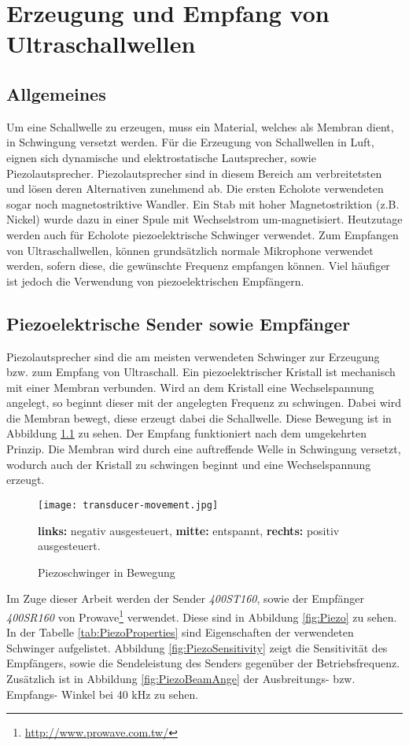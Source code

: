 \chapter{Erzeugung und Empfang von Ultraschallwellen}
\label{cha:UltraschallSendRecive}
\section{Allgemeines}
Um eine Schallwelle zu erzeugen, muss ein Material, welches als Membran dient, in Schwingung versetzt werden. Für die Erzeugung von Schallwellen in Luft, eignen sich dynamische und elektrostatische Lautsprecher, sowie Piezolautsprecher. Piezolautsprecher sind in diesem Bereich am verbreitetsten und lösen deren Alternativen zunehmend ab. Die ersten Echolote verwendeten sogar noch magnetostriktive Wandler. Ein Stab mit hoher Magnetostriktion (z.B. Nickel) wurde dazu in einer Spule mit Wechselstrom um-magnetisiert.
Heutzutage werden auch für Echolote piezoelektrische Schwinger verwendet. Zum Empfangen von Ultraschallwellen, können grundsätzlich normale Mikrophone verwendet werden, sofern diese, die gewünschte Frequenz empfangen können. Viel häufiger ist jedoch die Verwendung von piezoelektrischen Empfängern.

\section{Piezoelektrische Sender sowie Empfänger}
Piezolautsprecher sind die am meisten verwendeten Schwinger zur Erzeugung bzw. zum Empfang von Ultraschall. Ein piezoelektrischer Kristall ist mechanisch mit einer Membran verbunden. Wird an dem Kristall eine Wechselspannung angelegt, so beginnt dieser mit der angelegten Frequenz zu schwingen. Dabei wird die Membran bewegt, diese erzeugt dabei die Schallwelle. Diese Bewegung ist in Abbildung \ref{fig:PiezoBewegung} zu sehen.
Der Empfang funktioniert nach dem umgekehrten Prinzip. Die Membran wird durch eine auftreffende Welle in Schwingung versetzt, wodurch auch der Kristall zu schwingen beginnt und eine Wechselspannung erzeugt.

\begin{figure}[H]
\centering
\texttt{[image: transducer-movement.jpg]}
\caption{Piezoschwinger in Bewegung \cite{ImgPiezoAnimation}}
\textbf{links:} negativ ausgesteuert, \textbf{mitte:} entspannt, \textbf{rechts:} positiv ausgesteuert.
\label{fig:PiezoBewegung}
\end{figure}

Im Zuge dieser Arbeit werden der Sender \emph{400ST160}, sowie der Empfänger \emph{400SR160} von Prowave\footnote{\url{http://www.prowave.com.tw/}} verwendet. Diese sind in Abbildung \ref{fig:Piezo} zu sehen. In der Tabelle \ref{tab:PiezoProperties} sind Eigenschaften der verwendeten Schwinger aufgelistet. Abbildung \ref{fig:PiezoSensitivity} zeigt die Sensitivität des Empfängers, sowie die Sendeleistung des Senders gegenüber der Betriebsfrequenz.
Zusätzlich ist in Abbildung \ref{fig:PiezoBeamAnge} der Ausbreitungs- bzw. Empfangs- Winkel bei 40 kHz zu sehen.

